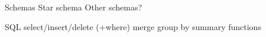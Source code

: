 \documentclass[aspectratio=169]{beamer}
\begin{document}


	\begin{frame}{Schemas}
		Star schema
		Other schemas?
	\end{frame}

	\begin{frame}{SQL}
		select/insert/delete (+where)
		merge
		group by
		summary functions
	\end{frame}
\end{document}
